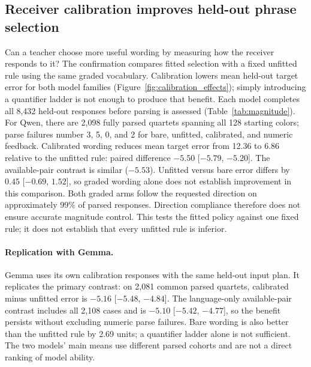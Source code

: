 \documentclass[11pt]{article}
\begin{document}
\subsection{Receiver calibration improves held-out phrase selection}
\label{sec:results_magnitude}
Can a teacher choose more useful wording by measuring how the receiver
responds to it? The confirmation compares fitted selection with a fixed
unfitted rule using the same graded vocabulary. Calibration lowers mean
held-out target error for both model families
(Figure~\ref{fig:calibration_effects}); simply introducing a quantifier
ladder is not enough to produce that benefit.
Each model completes all 8{,}432 held-out responses
before parsing is assessed (Table~\ref{tab:magnitude}).
For Qwen, there are 2{,}098 fully parsed quartets spanning all 128 starting colors;
parse failures number 3, 5, 0, and 2 for bare, unfitted, calibrated, and
numeric feedback. Calibrated wording reduces mean target error from 12.36
to 6.86 relative to the unfitted rule: paired difference $-5.50$
[$-5.79$, $-5.20$]. The available-pair contrast is similar ($-5.53$).
Unfitted versus bare error differs by $0.45$ [$-0.69$, $1.52$], so
graded wording alone does not establish improvement in this comparison.
Both graded arms follow the requested direction on approximately 99\%
of parsed responses. Direction compliance therefore does not ensure
accurate magnitude control. This tests the fitted policy against one fixed
rule; it does not establish that every unfitted rule is inferior.

\paragraph{Replication with Gemma.}
Gemma uses its own calibration responses with the same held-out input
plan. It replicates the primary contrast: on 2{,}081 common parsed quartets,
calibrated minus unfitted error is $-5.16$ [$-5.48$, $-4.84$].
The language-only available-pair contrast includes all 2{,}108 cases and
is $-5.10$ [$-5.42$, $-4.77$], so the benefit persists without excluding
numeric parse failures. Bare wording is also better than the unfitted rule
by 2.69 units; a quantifier ladder alone is not sufficient.
The two models' main means use different parsed cohorts and are not a
direct ranking of model ability.
\end{document}
